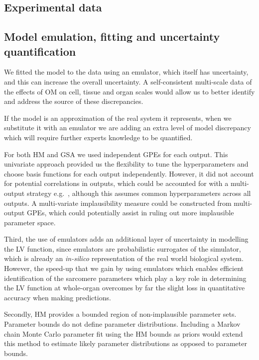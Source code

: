 %
%
%
\subsection{Experimental data}\label{sec:ch9experimental_data}

%
%
%
\subsection{Model emulation, fitting and uncertainty quantification}\label{sec:ch9model_emulation_fitting_and_uncertainty_quantification}
We fitted the model to the data using an emulator, which itself has uncertainty, and this can increase the overall uncertainty. A self-consistent multi-scale data of the effects of OM on cell, tissue and organ scales would allow us to better identify and address the source of these discrepancies.

\vspace{0.2cm}
If the model is an approximation of the real system it represents, when we substitute it with an emulator we are adding an extra level of model discrepancy which will require further experts knowledge to be quantified.

\vspace{0.2cm}
For both HM and GSA we used independent GPEs for each output. This univariate approach provided us the flexibility to tune the hyperparameters and choose basis functions for each output independently. However, it did not account for potential correlations in outputs, which could be accounted for with a multi-output strategy e.g.~\cite{Conti:2009}, although this assumes common hyperparameters across all outputs. A multi-variate implausibility measure could be constructed from multi-output GPEs, which could potentially assist in ruling out more implausible parameter space.

\vspace{0.2cm}
Third, the use of emulators adds an additional layer of uncertainty in modelling the LV function, since emulators are probabilistic surrogates of the simulator, which is already an \textit{in-silico} representation of the real world biological system. However, the speed-up that we gain by using emulators which enables efficient identification of the sarcomere parameters which play a key role in determining the LV function at whole-organ overcomes by far the slight loss in quantitative accuracy when making predictions.

Secondly, HM provides a bounded region of non-implausible parameter sets. Parameter bounds do not define parameter distributions. Including a Markov chain Monte Carlo parameter fit using the HM bounds as priors would extend this method to estimate likely parameter distributions as opposed to parameter bounds.

